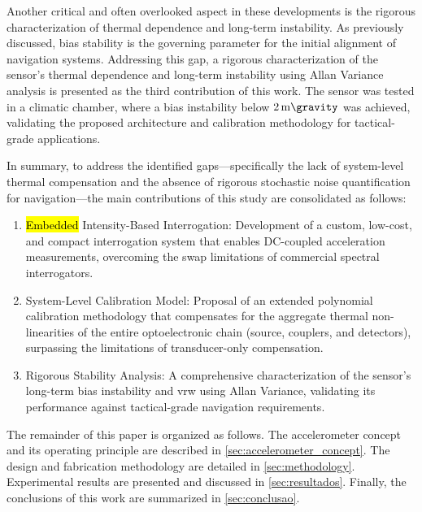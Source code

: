 \documentclass[sensors,article,accept,pdftex,moreauthors]{Definitions/mdpi}
\begin{document}
Another critical and often overlooked aspect in these developments is the rigorous characterization of thermal dependence and long-term instability. As previously discussed, bias stability is the governing parameter for the initial alignment of navigation systems. Addressing this gap, a rigorous characterization of the sensor's thermal dependence and long-term instability using Allan Variance analysis \citep{Li2013a} is presented as the third contribution of this work. The sensor was tested in a climatic chamber, where a bias instability below $\SI{2}{\milli\gravity}$ was achieved, validating the proposed architecture and calibration methodology for tactical-grade applications.


In summary, to address the identified gaps---specifically the lack of system-level thermal compensation and the absence of rigorous stochastic noise quantification for navigation---the main contributions of this study are consolidated as follows:

\begin{enumerate}
    \item {\hl{Embedded} %
 Intensity-Based Interrogation:} Development of a custom, low-cost, and compact interrogation system that enables DC-coupled acceleration measurements, overcoming the \gls{swap} limitations of commercial spectral interrogators.
    \item {System-Level Calibration Model:} Proposal of an extended polynomial calibration methodology that compensates for the aggregate thermal non-linearities of the entire optoelectronic chain (source, couplers, and detectors), surpassing the limitations of transducer-only compensation.
    \item {Rigorous Stability Analysis:} A comprehensive characterization of the sensor's long-term bias instability and \gls{vrw} using Allan Variance, validating its performance against tactical-grade navigation requirements.
\end{enumerate}


The remainder of this paper is organized as follows. The accelerometer concept and its operating principle are described in \cref{sec:accelerometer_concept}. The design and fabrication methodology are detailed in \cref{sec:methodology}. Experimental results are presented and discussed in \cref{sec:resultados}. Finally, the conclusions of this work are summarized in \cref{sec:conclusao}.
\end{document}
